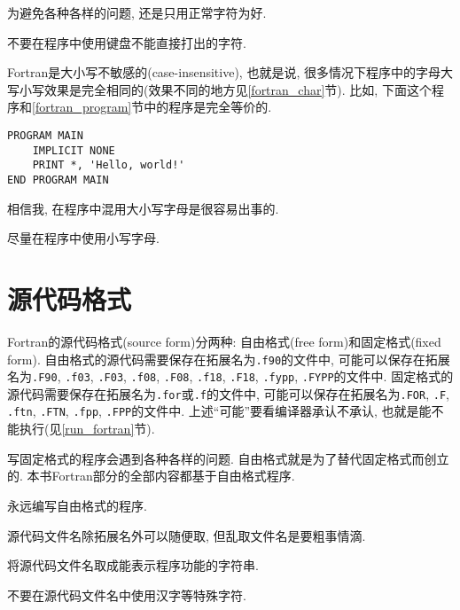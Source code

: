 为避免各种各样的问题, 还是只用正常字符为好.

\begin{convention}
    不要在程序中使用键盘不能直接打出的字符.
\end{convention}

Fortran是大小写不敏感的(case-insensitive), 也就是说, 很多情况下程序中的字母大写小写效果是完全相同的(效果不同的地方见\ref{fortran_char}节). 比如, 下面这个程序和\ref{fortran_program}节中的程序是完全等价的.
\begin{lstlisting}
PROGRAM MAIN
    IMPLICIT NONE
    PRINT *, 'Hello, world!'
END PROGRAM MAIN
\end{lstlisting}

相信我, 在程序中混用大小写字母是很容易出事的.

\begin{convention}
    尽量在程序中使用小写字母.
\end{convention}

\section{源代码格式}

Fortran的源代码格式(source form)分两种: 自由格式(free form)和固定格式(fixed form). 自由格式的源代码需要保存在拓展名为\texttt{.f90}的文件中, 可能可以保存在拓展名为\texttt{.F90}, \texttt{.f03}, \texttt{.F03}, \texttt{.f08}, \texttt{.F08}, \texttt{.f18}, \texttt{.F18}, \texttt{.fypp}, \texttt{.FYPP}的文件中. 固定格式的源代码需要保存在拓展名为\texttt{.for}或\texttt{.f}的文件中, 可能可以保存在拓展名为\texttt{.FOR}, \texttt{.F}, \texttt{.ftn}, \texttt{.FTN}, \texttt{.fpp}, \texttt{.FPP}的文件中. 上述``可能''要看编译器承认不承认, 也就是能不能执行(见\ref{run_fortran}节).

写固定格式的程序会遇到各种各样的问题. 自由格式就是为了替代固定格式而创立的. 本书Fortran部分的全部内容都基于自由格式程序.

\begin{convention}
    永远编写自由格式的程序.
\end{convention}

源代码文件名除拓展名外可以随便取, 但乱取文件名是要粗事情滴.

\begin{convention}
    将源代码文件名取成能表示程序功能的字符串.
\end{convention}

\begin{convention}
    不要在源代码文件名中使用汉字等特殊字符.
\end{convention}

